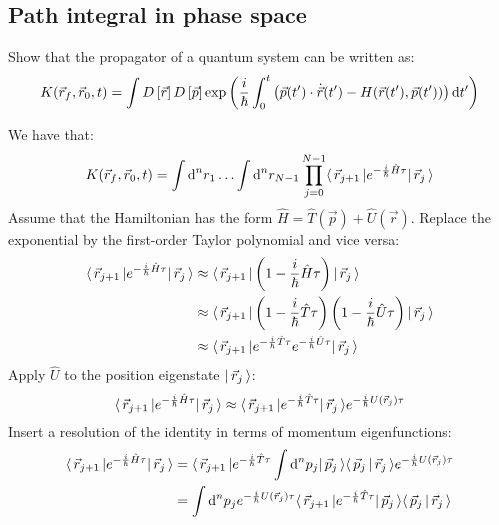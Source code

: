 \subsection{Path integral in phase space}

Show that the propagator of a quantum system can be written as:
\begin{equation}
  \label{result}
  K(\vec{r}_f, \vec{r}_0, t) = \int D\left[{\vec{r}}\right]D\left[{\vec{p}}\right]\exp\left(
  \frac{i}{\hbar}\int_{0}^{t}\left(
  \vec{p}(t^\prime) \cdot \dot{\vec{r}}(t^\prime) - H(\vec{r}(t^\prime), \vec{p}(t^\prime))
  \right)\text{d}{}{t^\prime}
  \right)
\end{equation}

We have that:
\begin{equation}
  \label{start}
  K(\vec{r}_f, \vec{r}_0, t) = \int\text{d}^{n}r_{1}\ldots\int\text{d}^{n}r_{N - 1}
  \prod_{j = 0}^{N - 1} \langle\,\vec{r}_{j + 1}\,\rvert e^{-\frac{i}{\hbar} \hat{H}\tau} \lvert\,\vec{r}_j\,\rangle
\end{equation}
Assume that the Hamiltonian has the form $\hat{H} = \hat{T}(\vec{p}) +
  \hat{U}(\vec{r})$.
Replace the exponential by the first-order Taylor polynomial and vice versa:
\begin{align*}
  \langle\,\vec{r}_{j + 1}\,\rvert
  e^{-\frac{i}{\hbar}\hat{H}\tau}
  \lvert\,\vec{r}_j\,\rangle
   & \approx
  \langle\,\vec{r}_{j + 1}\,\rvert
  \left(1 - \frac{i}{\hbar}\hat{H}\tau\right)
  \lvert\,\vec{r}_j\,\rangle
  \\
   & \approx
  \langle\,\vec{r}_{j + 1}\,\rvert
  \left(1 - \frac{i}{\hbar}\hat{T}\tau\right)
  \left(1 - \frac{i}{\hbar}\hat{U}\tau\right)
  \lvert\,\vec{r}_j\,\rangle
  \\
   & \approx
  \langle\,\vec{r}_{j + 1}\,\rvert
  e^{-\frac{i}{\hbar} \hat{T}\tau} e^{-\frac{i}{\hbar} \hat{U}\tau}
  \lvert\,\vec{r}_j\,\rangle
\end{align*}
Apply $\hat{U}$ to the position eigenstate $\lvert\,\vec{r}_j\,\rangle$:
\begin{equation*}
  \langle\,\vec{r}_{j + 1}\,\rvert
  e^{-\frac{i}{\hbar}\hat{H}\tau}
  \lvert\,\vec{r}_j\,\rangle
  \approx \langle\,\vec{r}_{j + 1}\,\rvert
  e^{-\frac{i}{\hbar} \hat{T}\tau}
  \lvert\,\vec{r}_j\,\rangle
  e^{-\frac{i}{\hbar} U(\vec{r}_j)\tau}
\end{equation*}
Insert a resolution of the identity in terms of momentum eigenfunctions:
\begin{align*}
  \langle\,\vec{r}_{j + 1}\,\rvert
  e^{-\frac{i}{\hbar} \hat{H}\tau}
  \lvert\,\vec{r}_j\,\rangle
   & =
  \langle\,\vec{r}_{j + 1}\,\rvert
  e^{-\frac{i}{\hbar} \hat{T}\tau}
  \int\text{d}^{n}p_{j}
  \lvert\,\vec{p}_j\,\rangle
  \langle\,\vec{p}_j\,\vert\,\vec{r}_j\,\rangle
  e^{-\frac{i}{\hbar} U(\vec{r}_j)\tau}
  \\
   & =
  \int\text{d}^{n}p_{j}
  e^{-\frac{i}{\hbar} U(\vec{r}_j)\tau}
  \langle\,\vec{r}_{j + 1}\,\rvert
  e^{-\frac{i}{\hbar} \hat{T}\tau}
  \lvert\,\vec{p}_j\,\rangle
  \langle\,\vec{p}_j\,\vert\,\vec{r}_j\,\rangle
\end{align*}
